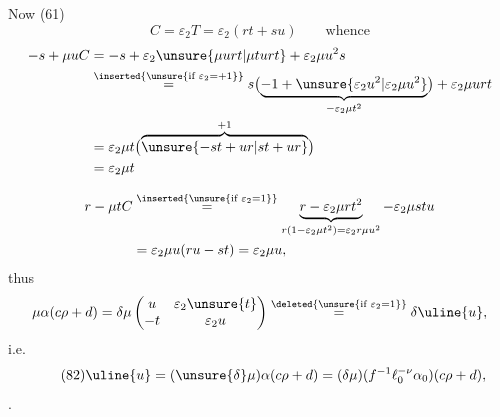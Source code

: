 Now (61)
\[
C=\varepsilon_2T=\varepsilon_2(rt+su)\qquad\text{whence}
\]
\[
\begin{aligned}
-s+\mu uC
&=-s+\varepsilon_2\unsure{\mu urt|\mu turt}+\varepsilon_2\mu u^2s\\
&\overset{\inserted{\unsure{\text{if }\varepsilon_2=+1}}}{=}
 s\bigl(\underbrace{-1+\unsure{\varepsilon_2u^2|\varepsilon_2\mu u^2}}_{-\varepsilon_2\mu t^2}\bigr)
 +\varepsilon_2\mu urt\\
&=\varepsilon_2\mu t\bigl(\overbrace{\unsure{-st+ur|st+ur}}^{+1}\bigr)\\
&=\varepsilon_2\mu t
\end{aligned}
\]



\[
\begin{aligned}
r-\mu tC
&\overset{\inserted{\unsure{\text{if }\varepsilon_2=1}}}{=}
\underbrace{r-\varepsilon_2\mu rt^2}_{r(1-\varepsilon_2\mu t^2)=\varepsilon_2r\mu u^2}
-\varepsilon_2\mu stu\\
&=\varepsilon_2\mu u(ru-st)=\varepsilon_2\mu u,
\end{aligned}
\]
thus
\[
\mu\alpha(c\rho+d)
=\delta\mu\begin{pmatrix}u&\varepsilon_2\unsure{t}\\-t&\varepsilon_2u\end{pmatrix}
\overset{\deleted{\unsure{\text{if }\varepsilon_2=1}}}{=}\delta\uline{u},
\]
i.e.
\[
\tag{82}
\uline{u}=(\unsure{\delta}\mu)\alpha(c\rho+d)
=(\delta\mu)(f^{-1}\ell_0^{-\nu}\alpha_0)(c\rho+d),
\]
.

